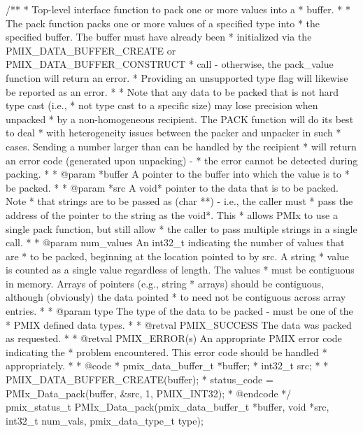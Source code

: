 \cspecificstart
\begin{codepar}
/**
 * Top-level interface function to pack one or more values into a
 * buffer.
 *
 * The pack function packs one or more values of a specified type into
 * the specified buffer.  The buffer must have already been
 * initialized via the PMIX_DATA_BUFFER_CREATE or PMIX_DATA_BUFFER_CONSTRUCT
 * call - otherwise, the pack_value function will return an error.
 * Providing an unsupported type flag will likewise be reported as an error.
 *
 * Note that any data to be packed that is not hard type cast (i.e.,
 * not type cast to a specific size) may lose precision when unpacked
 * by a non-homogeneous recipient.  The PACK function will do its best to deal
 * with heterogeneity issues between the packer and unpacker in such
 * cases. Sending a number larger than can be handled by the recipient
 * will return an error code (generated upon unpacking) -
 * the error cannot be detected during packing.
 *
 * @param *buffer A pointer to the buffer into which the value is to
 * be packed.
 *
 * @param *src A void* pointer to the data that is to be packed. Note
 * that strings are to be passed as (char **) - i.e., the caller must
 * pass the address of the pointer to the string as the void*. This
 * allows PMIx to use a single pack function, but still allow
 * the caller to pass multiple strings in a single call.
 *
 * @param num_values An int32_t indicating the number of values that are
 * to be packed, beginning at the location pointed to by src. A string
 * value is counted as a single value regardless of length. The values
 * must be contiguous in memory. Arrays of pointers (e.g., string
 * arrays) should be contiguous, although (obviously) the data pointed
 * to need not be contiguous across array entries.
 *
 * @param type The type of the data to be packed - must be one of the
 * PMIX defined data types.
 *
 * @retval PMIX_SUCCESS The data was packed as requested.
 *
 * @retval PMIX_ERROR(s) An appropriate PMIX error code indicating the
 * problem encountered. This error code should be handled
 * appropriately.
 *
 * @code
 * pmix_data_buffer_t *buffer;
 * int32_t src;
 *
 * PMIX_DATA_BUFFER_CREATE(buffer);
 * status_code = PMIx_Data_pack(buffer, &src, 1, PMIX_INT32);
 * @endcode
 */
pmix_status_t
PMIx_Data_pack(pmix_data_buffer_t *buffer,
               void *src, int32_t num_vals,
               pmix_data_type_t type);
\end{codepar}
\cspecificend


\subsection{}

